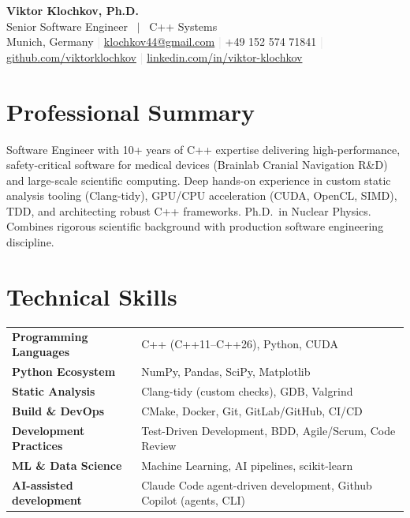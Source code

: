 \documentclass[11pt, a4paper]{article}
\newcommand{\skillrow}[2]{%
  \textcolor{navyblue}{\textbf{#1}} & #2 \\[3pt]
}
\begin{document}
\begin{center}
  {\fontsize{26}{30}\selectfont\bfseries\color{navyblue} Viktor Klochkov, Ph.D.}\\[6pt]
  {\large\color{lightgray} Senior Software Engineer \ $|$ \ C++ Systems}\\[8pt]
  \small
  Munich, Germany
  \quad\textcolor{lightgray}{|}
  \href{mailto:klochkov44@gmail.com}{klochkov44@gmail.com}
  \quad\textcolor{lightgray}{|}
  +49 152 574 71841
  \quad\textcolor{lightgray}{|}
  \href{https://github.com/viktorklochkov}{github.com/viktorklochkov}
  \quad\textcolor{lightgray}{|}
  \href{https://www.linkedin.com/in/viktor-klochkov/}{linkedin.com/in/viktor-klochkov}
\end{center}

\vspace{2pt}

\section{Professional Summary}

Software Engineer with 10+ years of C++ expertise delivering high-performance, safety-critical software for medical devices (Brainlab Cranial Navigation R\&D) and large-scale scientific computing. Deep hands-on experience in custom static analysis tooling (Clang-tidy), GPU/CPU acceleration (CUDA, OpenCL, SIMD), TDD, and architecting robust C++ frameworks. Ph.D.\ in Nuclear Physics. Combines rigorous scientific background with production software engineering discipline.

\section{Technical Skills}

\renewcommand{\arraystretch}{1.15}
\begin{tabularx}{\textwidth}{@{} >{\raggedright}p{4.2cm} X @{}}
  \skillrow{Programming Languages}{C++ (C++11--C++26), Python, CUDA}
  \skillrow{Python Ecosystem}{NumPy, Pandas, SciPy, Matplotlib}
  \skillrow{Static Analysis}{Clang-tidy (custom checks), GDB, Valgrind}
  \skillrow{Build \& DevOps}{CMake, Docker, Git, GitLab/GitHub, CI/CD}
  \skillrow{Development Practices}{Test-Driven Development, BDD, Agile/Scrum, Code Review}
  \skillrow{ML \& Data Science}{Machine Learning, AI pipelines, scikit-learn}
  \skillrow{AI-assisted development}{Claude Code agent-driven development, Github Copilot (agents, CLI)}
\end{tabularx}
\end{document}

